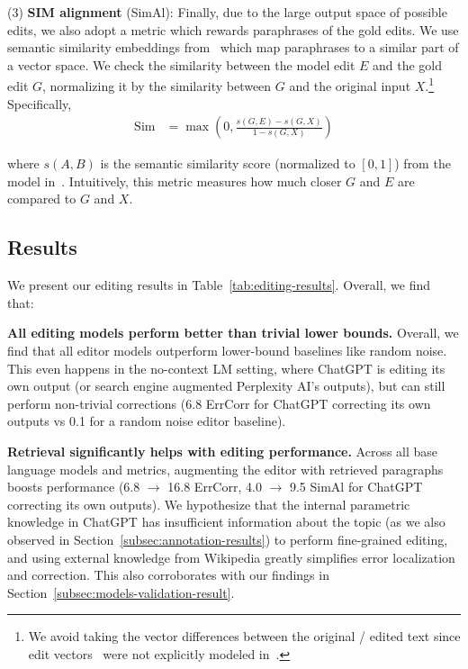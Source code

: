 \vspace{.3em}

\noindent (3) \textbf{SIM alignment} (SimAl): Finally, due to the large output space of possible edits, we also adopt a metric which rewards paraphrases of the gold edits. We use semantic similarity embeddings from~\citet{wieting-etal-2022-paraphrastic} which map paraphrases to a similar part of a vector space. We check the similarity between the model edit $E$ and the gold edit $G$, normalizing it by the similarity between $G$ and the original input $X$.\footnote{We avoid taking the vector differences between the original / edited text since edit vectors~\citep{guu2018generating} were not explicitly modeled in~\citet{wieting-etal-2022-paraphrastic}.} Specifically,
\begin{align*}
    \text{Sim} &= \max\left(0, \frac{s(G, E) - s(G, X)}{1 - s(G, X)} \right)
\end{align*}

where $s(A,B)$ is the semantic similarity score (normalized to $[0, 1]$) from the model in~\citet{wieting-etal-2022-paraphrastic}. Intuitively, this metric measures how much closer $G$ and $E$ are compared to $G$ and $X$.


\subsection{Results}\label{subsubsec:editing-results}

We present our editing results in Table~\ref{tab:editing-results}. Overall, we find that:

\vspace{.3em}

\noindent \textbf{All editing models perform better than trivial lower bounds.} Overall, we find that all editor models outperform lower-bound baselines like random noise. This even happens in the no-context LM setting, where ChatGPT is editing its own output (or search engine augmented Perplexity AI's outputs), but can still perform non-trivial corrections (6.8 ErrCorr for ChatGPT correcting its own outputs vs 0.1 for a random noise editor baseline).


\vspace{.3em}

\noindent \textbf{Retrieval significantly helps with editing performance.} Across all base language models and metrics, augmenting the editor with retrieved paragraphs boosts performance (6.8 $\rightarrow$ 16.8 ErrCorr, 4.0 $\rightarrow$ 9.5 SimAl for ChatGPT correcting its own outputs). We hypothesize that the internal parametric knowledge in ChatGPT has insufficient information about the topic (as we also observed in Section~\ref{subsec:annotation-results}) to perform fine-grained editing, and using external knowledge from Wikipedia greatly simplifies error localization and correction. This also corroborates with our findings in Section~\ref{subsec:models-validation-result}.

